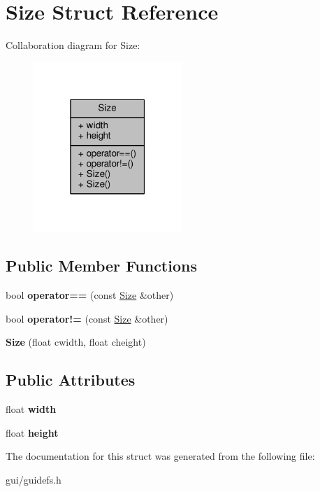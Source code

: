 \hypertarget{structSize}{}\section{Size Struct Reference}
\label{structSize}


Collaboration diagram for Size\+:
\nopagebreak
\begin{figure}[H]
\begin{center}
\leavevmode
\includegraphics[width=159pt]{d5/d15/structSize__coll__graph}
\end{center}
\end{figure}
\subsection*{Public Member Functions}
\begin{DoxyCompactItemize}
\item 
bool {\bfseries operator==} (const \hyperlink{structSize}{Size} \&other)\hypertarget{structSize_a2b07775d14ff93148a91ccf5dc663319}{}\label{structSize_a2b07775d14ff93148a91ccf5dc663319}

\item 
bool {\bfseries operator!=} (const \hyperlink{structSize}{Size} \&other)\hypertarget{structSize_a77b22b8f07271c4066d3a5d6c80fb1af}{}\label{structSize_a77b22b8f07271c4066d3a5d6c80fb1af}

\item 
{\bfseries Size} (float cwidth, float cheight)\hypertarget{structSize_a4dfdc7cb5bda2c31c3347d36f3572fc3}{}\label{structSize_a4dfdc7cb5bda2c31c3347d36f3572fc3}

\end{DoxyCompactItemize}
\subsection*{Public Attributes}
\begin{DoxyCompactItemize}
\item 
float {\bfseries width}\hypertarget{structSize_af0be19024ddd79e7843492b3760c21f0}{}\label{structSize_af0be19024ddd79e7843492b3760c21f0}

\item 
float {\bfseries height}\hypertarget{structSize_a880fa21eaad5a5a0fe439d440776fd05}{}\label{structSize_a880fa21eaad5a5a0fe439d440776fd05}

\end{DoxyCompactItemize}


The documentation for this struct was generated from the following file\+:\begin{DoxyCompactItemize}
\item 
gui/guidefs.\+h\end{DoxyCompactItemize}
